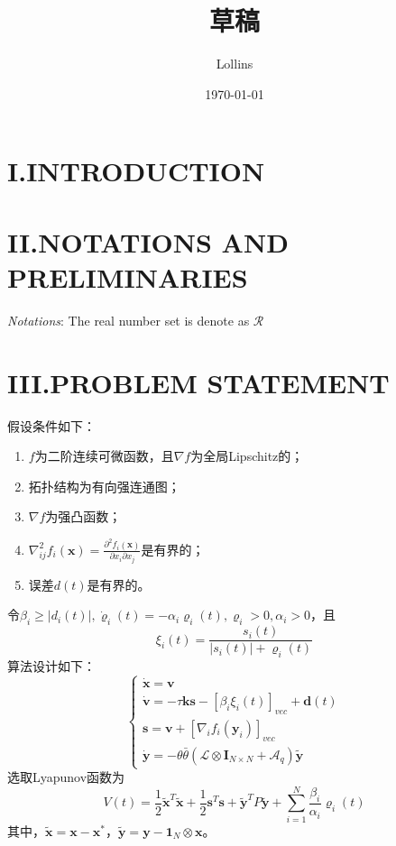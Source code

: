 \documentclass[12pt, a4paper, oneside]{ctexbook}
\title{{\Huge{\textbf{草稿}}}}
\author{Lollins}
\date{\today}
\begin{document}
\setcounter{page}{1}

\setcounter{page}{1}

\section*{I.\quad INTRODUCTION}
\section*{II.\quad NOTATIONS AND PRELIMINARIES}
\emph{Notations}: The real number set is denote as $\mathcal{R}$



\section*{III.\quad PROBLEM STATEMENT}

假设条件如下：
\begin{enumerate}
    \item $f$为二阶连续可微函数，且$\nabla f$为全局Lipschitz的；
    \item 拓扑结构为有向强连通图；
    \item $\nabla f$为强凸函数；
    \item $\nabla_{ij}^{2}f_{i}(\mathbf{x})=\frac{\partial^{2}f_{i}(\mathbf{x})}{\partial x_{i}\partial x_{j}}$是有界的；
    \item 误差$d(t)$是有界的。
\end{enumerate}
令$\beta_i \geq | d_i(t) |, \dot{\varrho}_i(t) = -\alpha_i \varrho_i(t), \varrho_i > 0, \alpha_i > 0$，且
$$
    \xi_i(t) = \frac{s_i(t)}{|s_i(t)| + \varrho_i(t)}
$$
算法设计如下：
$$
    \begin{cases}
        \dot{\mathbf{x}}=\mathbf{v}                                                      \\
        \dot{\mathbf{v}}=-\tau\mathbf{k}\mathbf{s}-[\beta_i\xi_i(t)]_{vec}+\mathbf{d}(t) \\
        \mathbf{s}=\mathbf{v}+[\nabla_if_i(\mathbf{y}_i)]_{vec}                          \\
        \dot{\mathbf{y}}=-\theta\bar{\theta}(\mathcal{L}\otimes\mathbf{I}_{N\times N}+\mathcal{A}_q)\tilde{\mathbf{y}}
    \end{cases}
$$
选取Lyapunov函数为
$$
    V(t) = \frac{1}{2}\tilde{\mathbf{x}}^{T}\tilde{\mathbf{x}}+\frac{1}{2}\mathbf{s}^{T}\mathbf{s}+\tilde{\mathbf{y}}^{T}P\tilde{\mathbf{y}} + \sum_{i = 1}^{N} \frac{\beta_i}{\alpha_i}\varrho_i(t)
$$
其中，$\tilde{\mathbf{x}} = \mathbf{x} - \mathbf{x}^*$，$\tilde{\mathbf{y}} = \mathbf{y} - \mathbf{1}_N \otimes \mathbf{x}$。
\end{document}
